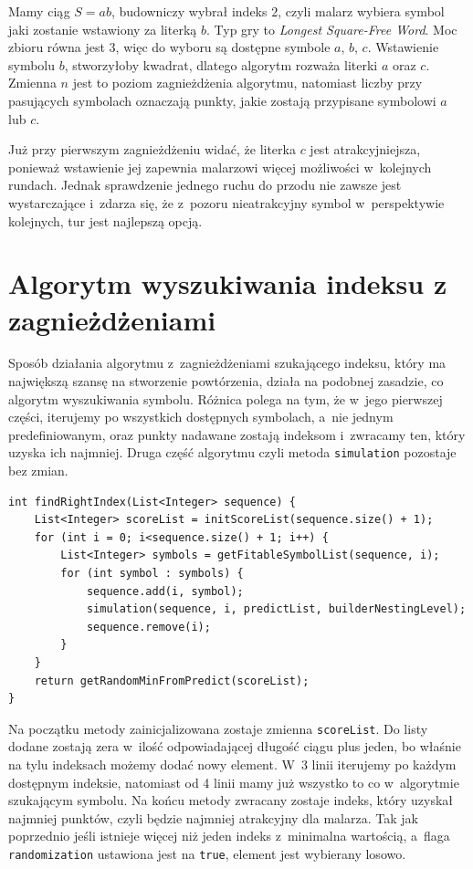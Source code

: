 \documentclass[document]{xmgr}
\begin{document}
Mamy ciąg $S = ab$, budowniczy wybrał indeks $2$, czyli malarz wybiera symbol jaki zostanie wstawiony za literką $b$. Typ gry to \emph{Longest Square-Free Word}. Moc zbioru równa jest $3$, więc do wyboru są dostępne symbole $a$, $b$, $c$. Wstawienie symbolu $b$, stworzyłoby kwadrat, dlatego algorytm rozważa literki $a$ oraz $c$. Zmienna $n$ jest to poziom zagnieżdżenia algorytmu, natomiast liczby przy pasujących symbolach oznaczają punkty, jakie zostają przypisane symbolowi $a$ lub $c$. 

Już przy pierwszym zagnieżdżeniu widać, że literka $c$ jest atrakcyjniejsza, ponieważ wstawienie jej zapewnia malarzowi więcej możliwości w~kolejnych rundach. Jednak sprawdzenie jednego ruchu do przodu nie zawsze jest wystarczające i~zdarza się, że z~pozoru nieatrakcyjny symbol w~perspektywie kolejnych, tur jest najlepszą opcją.

\section{Algorytm wyszukiwania indeksu z zagnieżdżeniami}
Sposób działania algorytmu z~zagnieżdżeniami szukającego indeksu, który ma największą szansę na stworzenie powtórzenia, działa na podobnej zasadzie, co algorytm wyszukiwania symbolu. Różnica polega na tym, że w~jego pierwszej części, iterujemy po wszystkich dostępnych symbolach, a~nie jednym predefiniowanym, oraz punkty nadawane zostają indeksom i~zwracamy ten, który uzyska ich najmniej. Druga część algorytmu czyli metoda \texttt{simulation} pozostaje bez zmian.

\begin{lstlisting}[frame=single]
int findRightIndex(List<Integer> sequence) {
	List<Integer> scoreList = initScoreList(sequence.size() + 1);
	for (int i = 0; i<sequence.size() + 1; i++) {
		List<Integer> symbols = getFitableSymbolList(sequence, i);
		for (int symbol : symbols) {
			sequence.add(i, symbol);
			simulation(sequence, i, predictList, builderNestingLevel);
			sequence.remove(i);
		}
	}
	return getRandomMinFromPredict(scoreList);
}
\end{lstlisting}

Na początku metody zainicjalizowana zostaje zmienna \texttt{scoreList}. Do listy dodane zostają zera w~ilość odpowiadającej długość ciągu plus jeden, bo właśnie na tylu indeksach możemy dodać nowy element. W~3 linii iterujemy po każdym dostępnym indeksie, natomiast od 4 linii mamy już wszystko to co w~algorytmie szukającym symbolu. Na końcu metody zwracany zostaje indeks, który uzyskał najmniej punktów, czyli będzie najmniej atrakcyjny dla malarza. Tak jak poprzednio jeśli istnieje więcej niż jeden indeks z~minimalna wartością, a~flaga \texttt{randomization} ustawiona jest na \texttt{true}, element jest wybierany losowo.
\end{document}
